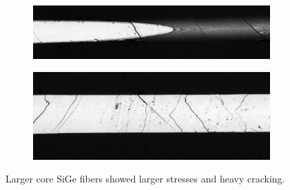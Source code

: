 \begin{figure}
\begin{subfigure}{\textwidth}
  \centering
  \includegraphics[width=\linewidth]{fig/polishing/SiGe_edit.jpg}
\end{subfigure}%

\begin{subfigure}{\textwidth}
  \centering
  \includegraphics[width=\linewidth]{fig/polishing/SiGe2_edit.jpg}
 
\end{subfigure}
\caption{Larger core SiGe fibers showed larger stresses and heavy cracking.}
\label{fig:si_sige}
\end{figure}








